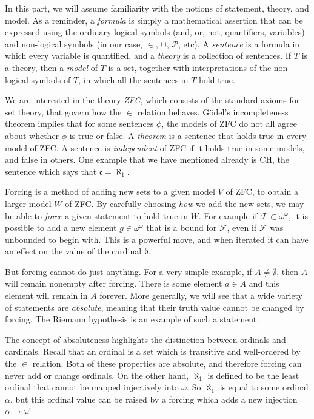 \documentclass[11pt,oneside]{amsbook}
\theoremstyle{definition}
\theoremstyle{plain}
\theoremstyle{definition}
\theoremstyle{remark}
\begin{document}
In this part, we will assume familiarity with the notions of statement, theory, and model. As a reminder, a \emph{formula} is simply a mathematical assertion that can be expressed using the ordinary logical symbols (and, or, not, quantifiers, variables) and non-logical symbols (in our case, $\in$, $\cup$, $\mathcal P$, etc). A \emph{sentence} is a formula in which every variable is quantified, and a \emph{theory} is a collection of sentences. If $T$ is a theory, then a \emph{model} of $T$ is a set, together with interpretations of the non-logical symbols of $T$, in which all the sentences in $T$ hold true.

We are interested in the theory \emph{ZFC}, which consists of the standard axioms for set theory, that govern how the $\in$ relation behaves. G\"odel's incompleteness theorem implies that for some sentences $\phi$, the models of ZFC do not all agree about whether $\phi$ is true or false. A \emph{theorem} is a sentence that holds true in every model of ZFC. A sentence is \emph{independent} of ZFC if it holds true in some models, and false in others. One example that we have mentioned already is CH, the sentence which says that $\mathfrak c=\aleph_1$.

Forcing is a method of adding new sets to a given model $V$ of ZFC, to obtain a larger model $W$ of ZFC. By carefully choosing \emph{how} we add the new sets, we may be able to \emph{force} a given statement to hold true in $W$. For example if $\mathcal F\subset\omega^\omega$, it is possible to add a new element $g\in\omega^\omega$ that is a bound for $\mathcal F$, even if $\mathcal F$ was unbounded to begin with. This is a powerful move, and when iterated it can have an effect on the value of the cardinal $\mathfrak b$.

But forcing cannot do just anything. For a very simple example, if $A\neq\emptyset$, then $A$ will remain nonempty after forcing. There is some element $a\in A$ and this element will remain in $A$ forever. More generally, we will see that a wide variety of statements are \emph{absolute}, meaning that their truth value cannot be changed by forcing. The Riemann hypothesis is an example of such a statement.

The concept of absoluteness highlights the distinction between ordinals and cardinals. Recall that an ordinal is a set which is transitive and well-ordered by the $\in$ relation. Both of these properties are absolute, and therefore forcing can never add or change ordinals. On the other hand, $\aleph_1$ is defined to be the least ordinal that cannot be mapped injectively into $\omega$. So $\aleph_1$ is equal to some ordinal $\alpha$, but this ordinal value can be raised by a forcing which adds a new injection $\alpha\to\omega$!
\end{document}
